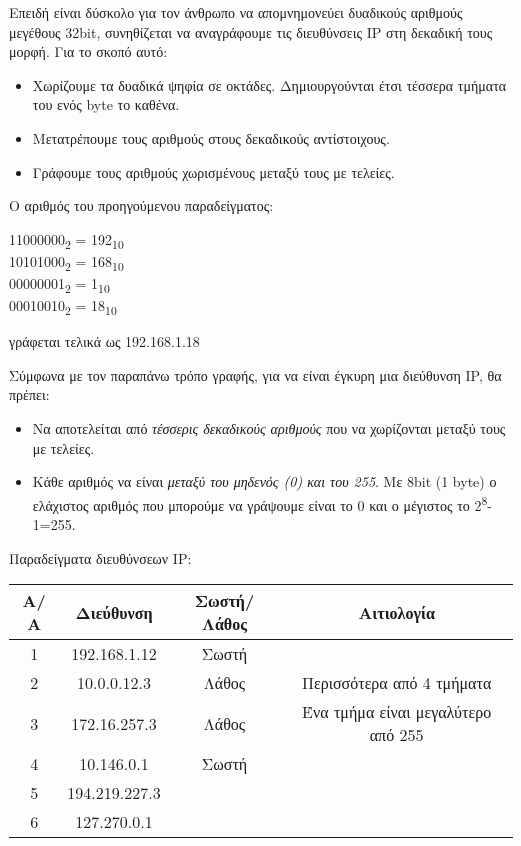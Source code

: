 Επειδή είναι δύσκολο για τον άνθρωπο να απομνημονεύει δυαδικούς αριθμούς μεγέθους 32bit, συνηθίζεται να αναγράφουμε τις διευθύνσεις IP στη δεκαδική τους μορφή. Για το σκοπό αυτό:

\begin{itemize}
\item Χωρίζουμε τα δυαδικά ψηφία σε οκτάδες. Δημιουργούνται έτσι τέσσερα τμήματα του ενός byte το καθένα.
\item Μετατρέπουμε τους αριθμούς στους δεκαδικούς αντίστοιχους.
\item Γράφουμε τους αριθμούς χωρισμένους μεταξύ τους με τελείες.
\end{itemize}

Ο αριθμός του προηγούμενου παραδείγματος:

11000000\textsubscript{2} = 192\textsubscript{10}\\
10101000\textsubscript{2} = 168\textsubscript{10}\\
00000001\textsubscript{2} = 1\textsubscript{10}\\
00010010\textsubscript{2} = 18\textsubscript{10}

γράφεται τελικά ως 192.168.1.18

Σύμφωνα με τον παραπάνω τρόπο γραφής, για να είναι έγκυρη μια διεύθυνση IP, θα πρέπει:

\begin{itemize}
\item Να αποτελείται από \emph{τέσσερις δεκαδικούς αριθμούς} που να χωρίζονται μεταξύ τους με τελείες.
\item Κάθε αριθμός να είναι \emph{μεταξύ του μηδενός (0)  και του 255}. Με 8bit (1 byte) ο ελάχιστος αριθμός που μπορούμε να γράψουμε είναι το 0 και ο μέγιστος το 2\textsuperscript{8}-1=255. 
\end{itemize}

Παραδείγματα διευθύνσεων IP:

\begin{tabular}{|c|c|c|c|}
\hline
\rowcolor[gray]{0.95}
Α/Α & Διεύθυνση & Σωστή/Λάθος & Αιτιολογία\\
\hline
1 & 192.168.1.12 & Σωστή &  \\
\hline
2 & 10.0.0.12.3 & Λάθος & Περισσότερα από 4 τμήματα \\
\hline
3 & 172.16.257.3 & Λάθος & Ένα τμήμα είναι μεγαλύτερο από 255 \\
\hline
4 & 10.146.0.1 & Σωστή & \\
\hline
5 & 194.219.227.3 & & \\
\hline
6 & 127.270.0.1 & & \\
\hline
\end{tabular}

